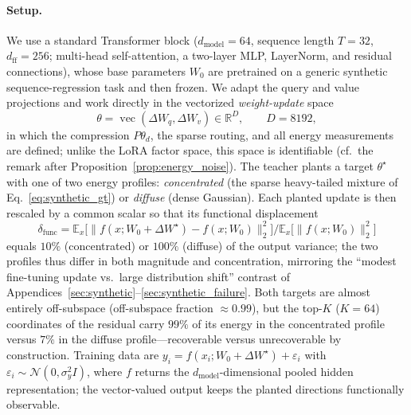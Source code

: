\paragraph{Setup.}
We use a standard Transformer block ($d_{\mathrm{model}}=64$, sequence length
$T=32$, $d_{\mathrm{ff}}=256$; multi-head self-attention, a two-layer MLP,
LayerNorm, and residual connections), whose base parameters $W_0$ are
pretrained on a generic synthetic sequence-regression task and then frozen.
We adapt the query and value projections and work directly in the vectorized
\emph{weight-update} space
\begin{equation}
    \theta
    =
    \operatorname{vec}(\Delta W_q,\Delta W_v)
    \in\mathbb{R}^{D},
    \qquad
    D=8192,
\end{equation}
in which the compression $P\theta_d$, the sparse routing, and all energy
measurements are defined; unlike the LoRA factor space, this space is
identifiable (cf.\ the remark after Proposition~\ref{prop:energy_noise}).
The teacher plants a target $\theta^\star$ with one of two energy profiles:
\emph{concentrated} (the sparse heavy-tailed mixture of
Eq.~\eqref{eq:synthetic_gt}) or \emph{diffuse} (dense Gaussian).
Each planted update is then rescaled by a common scalar so that its
functional displacement
\begin{equation}
    \delta_{\mathrm{func}}
    =
    \mathbb{E}_{x}\big[\|f(x;W_0+\Delta W^\star)-f(x;W_0)\|_2^2\big]
    \big/
    \mathbb{E}_{x}\big[\|f(x;W_0)\|_2^2\big]
    \label{eq:functional_displacement}
\end{equation}
equals $10\%$ (concentrated) or $100\%$ (diffuse) of the output variance;
the two profiles thus differ in both magnitude and concentration, mirroring
the ``modest fine-tuning update vs.\ large distribution shift'' contrast of
Appendices~\ref{sec:synthetic}--\ref{sec:synthetic_failure}.
Both targets are almost entirely off-subspace (off-subspace fraction
$\approx 0.99$), but the top-$K$ ($K=64$) coordinates of the residual carry
$99\%$ of its energy in the concentrated profile versus $7\%$ in the diffuse
profile---recoverable versus unrecoverable by construction.
Training data are $y_i=f(x_i;W_0+\Delta W^\star)+\varepsilon_i$ with
$\varepsilon_i\sim\mathcal{N}(0,\sigma_y^2I)$, where $f$ returns the
$d_{\mathrm{model}}$-dimensional pooled hidden representation; the
vector-valued output keeps the planted directions functionally observable.

